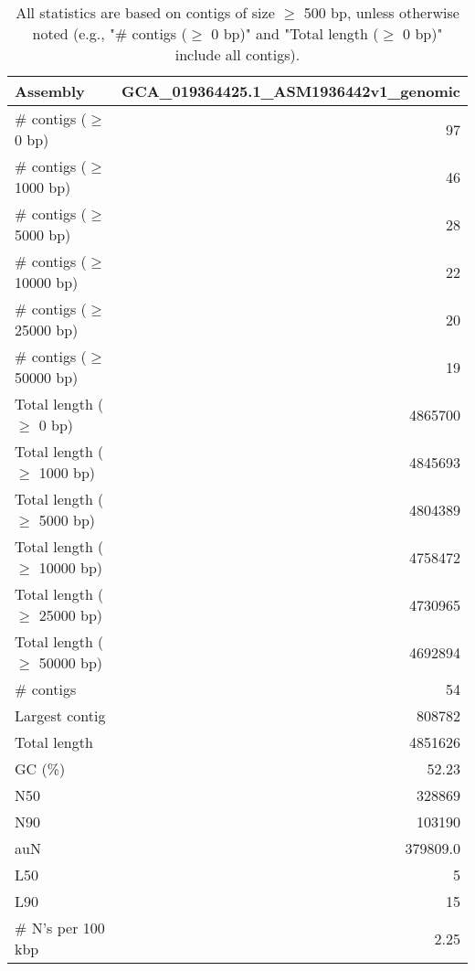 \documentclass[12pt,a4paper]{article}
\begin{document}
\begin{table}[ht]
\begin{center}
\caption{All statistics are based on contigs of size $\geq$ 500 bp, unless otherwise noted (e.g., "\# contigs ($\geq$ 0 bp)" and "Total length ($\geq$ 0 bp)" include all contigs).}
\begin{tabular}{|l*{1}{|r}|}
\hline
Assembly & GCA\_019364425.1\_ASM1936442v1\_genomic \\ \hline
\# contigs ($\geq$ 0 bp) & 97 \\ \hline
\# contigs ($\geq$ 1000 bp) & 46 \\ \hline
\# contigs ($\geq$ 5000 bp) & 28 \\ \hline
\# contigs ($\geq$ 10000 bp) & 22 \\ \hline
\# contigs ($\geq$ 25000 bp) & 20 \\ \hline
\# contigs ($\geq$ 50000 bp) & 19 \\ \hline
Total length ($\geq$ 0 bp) & 4865700 \\ \hline
Total length ($\geq$ 1000 bp) & 4845693 \\ \hline
Total length ($\geq$ 5000 bp) & 4804389 \\ \hline
Total length ($\geq$ 10000 bp) & 4758472 \\ \hline
Total length ($\geq$ 25000 bp) & 4730965 \\ \hline
Total length ($\geq$ 50000 bp) & 4692894 \\ \hline
\# contigs & 54 \\ \hline
Largest contig & 808782 \\ \hline
Total length & 4851626 \\ \hline
GC (\%) & 52.23 \\ \hline
N50 & 328869 \\ \hline
N90 & 103190 \\ \hline
auN & 379809.0 \\ \hline
L50 & 5 \\ \hline
L90 & 15 \\ \hline
\# N's per 100 kbp & 2.25 \\ \hline
\end{tabular}
\end{center}
\end{table}
\end{document}
